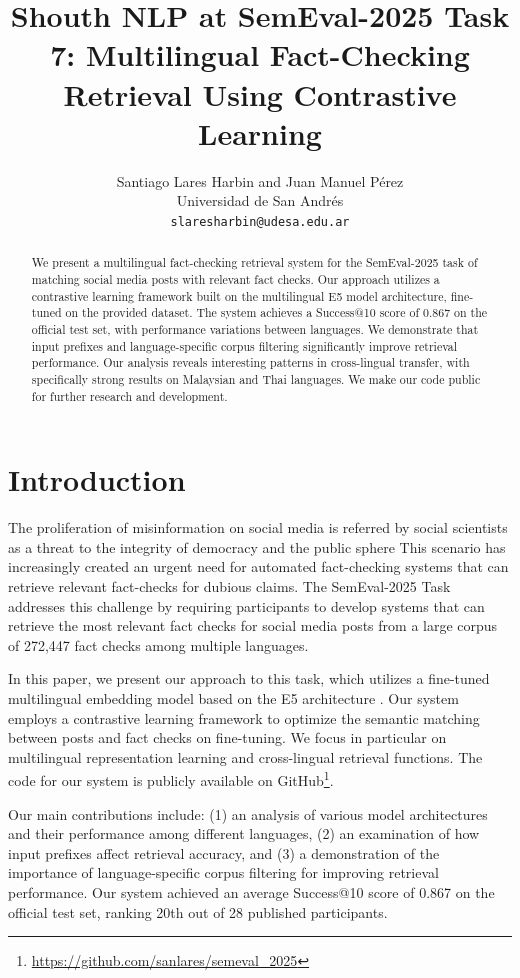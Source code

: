 \documentclass[11pt]{article}
\title{Shouth NLP at SemEval-2025 Task 7: Multilingual Fact-Checking Retrieval Using Contrastive Learning}
\author{}
\author{Santiago Lares Harbin and Juan Manuel Pérez \\
  Universidad de San Andrés \\
  \texttt{slaresharbin@udesa.edu.ar}}
\begin{document}
\maketitle
\begin{abstract}
We present a multilingual fact-checking retrieval system for the SemEval-2025 task of matching social media posts with relevant fact checks. Our approach utilizes a contrastive learning framework built on the multilingual E5 model architecture, fine-tuned on the provided dataset. The system achieves a Success@10 score of 0.867 on the official test set, with performance variations between languages. We demonstrate that input prefixes and language-specific corpus filtering significantly improve retrieval performance. Our analysis reveals interesting patterns in cross-lingual transfer, with specifically strong results on Malaysian and Thai languages. We
make our code public for further research and
development.
\end{abstract}

\section{Introduction}
The proliferation of misinformation on social media is referred by social scientists as a threat to the integrity of democracy and the public sphere \cite{chambers2021truth, lewandowsky2023misinformation}
This scenario has increasingly created an urgent need for automated fact-checking systems that can retrieve relevant fact-checks for dubious claims. The SemEval-2025 Task \cite{sebi2025multilingual} addresses this challenge by requiring participants to develop systems that can retrieve the most relevant fact checks for social media posts from a large corpus of 272,447 fact checks among multiple languages.

In this paper, we present our approach to this task, which utilizes a fine-tuned multilingual embedding model based on the E5 architecture \cite{wang2024multilingual}. Our system employs a contrastive learning framework to optimize the semantic matching between posts and fact checks on fine-tuning. We focus in particular on multilingual representation learning and cross-lingual retrieval functions. The code for our system is publicly available on GitHub\footnote{\url{https://github.com/sanlares/semeval_2025}}.

Our main contributions include: (1) an analysis of various model architectures and their performance among different languages, (2) an examination of how input prefixes affect retrieval accuracy, and (3) a demonstration of the importance of language-specific corpus filtering for improving retrieval performance. Our system achieved an average Success@10 score of 0.867 on the official test set, ranking 20th out of 28 published participants.
\end{document}

